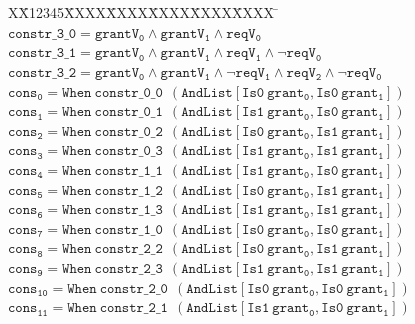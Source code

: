 \documentclass[final]{IEEEtran}
\newlength{\fminilength}
\newenvironment{fmini}[1][\linewidth]
  {\setlength{\fminilength}{#1\fboxsep-2\fboxrule}%
   \vspace{2ex}\noindent\begin{lrbox}{\fminibox}\begin{minipage}{\fminilength}%
   \mbox{ }\hfill\vspace{-2.5ex}}%
  {\end{minipage}\end{lrbox}\vspace{1ex}\hspace{0ex}%
   \framebox{\usebox{\fminibox}}}
\newenvironment{specification}
{\noindent\footnotesize\tt\begin{fmini}\begin{tabbing}X\=X12345\=XXXX\=XXXX\=XXXX\=XXXX\=XXXX
\=\+\kill} {\end{tabbing}\normalfont\end{fmini}}
\begin{document}
\begin{center}
\begin{table}
\begin{specification}
$\mathtt{constr\_3\_0= grantV_0\wedge grantV_1\wedge reqV_0 }$\\

$\mathtt{constr\_3\_1= grantV_0\wedge grantV_1\wedge reqV_1\wedge \neg reqV_0 }$\\

$\mathtt{constr\_3\_2=grantV_0\wedge grantV_1\wedge \neg reqV_1\wedge reqV_2\wedge \neg reqV_0}$\\



$\mathtt{cons_0= When\ constr\_0\_0\  \ (AndList [Is0\ grant_0,Is0\  grant_1])}$\\

$\mathtt{cons_1=When\ constr\_0\_1\ \ (AndList [Is1\
grant_0,Is0\  grant_1])}$\\

$\mathtt{cons_2=When\ constr\_0\_2\  \
(AndList [Is0\  grant_0,Is1\  grant_1])}$\\

$\mathtt{cons_3= When\ constr\_0\_3\  \ (AndList [Is1\  grant_0,Is1\  grant_1])}$\\


$\mathtt{cons_4=When\ constr\_1\_1\  \
(AndList [Is1\  grant_0,Is0\  grant_1])}$\\

$\mathtt{ cons_5= When\ constr\_1\_2\   \ ( AndList [Is0\
grant_0,Is1\  grant_1])}$\\

$\mathtt{cons_6=When\ constr\_1\_3\   \
(AndList   [Is1\  grant_0,Is1\  grant_1])}$\\

$\mathtt{cons_7=When\ constr\_1\_0\    \  (AndList [Is0\  grant_0,Is0\  grant_1])}$\\

$\mathtt{cons_8= When\ constr\_2\_2 \   \ ( AndList [Is0\  grant_0,Is1\  grant_1])}$\\

$\mathtt{cons_9= When\ constr\_2\_3\    \ (AndList [Is1\
grant_0,Is1\  grant_1])}$\\

$\mathtt{cons_{10}=When\ constr\_2\_0\   \ (
AndList [Is0\  grant_0,Is0\  grant_1])}$\\

$\mathtt{cons_{11}=When\ constr\_2\_1\   \  ( AndList [Is1\  grant_0,Is0\  grant_1])}$\\


\end{specification}
\end{table}
\end{center}
\end{document}
